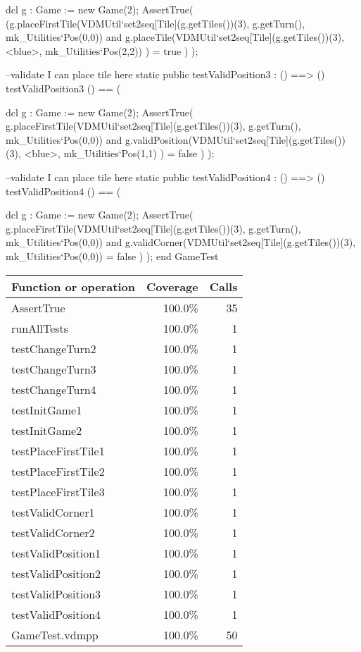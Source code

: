 \begin{vdm_al}
  dcl g : Game := new Game(2);
  AssertTrue( (g.placeFirstTile(VDMUtil`set2seq[Tile](g.getTiles())(3), g.getTurn(),
       mk_Utilities`Pos(0,0)) and g.placeTile(VDMUtil`set2seq[Tile](g.getTiles())(3),
       <blue>, mk_Utilities`Pos(2,2)) ) = true )
 );
 
 --validate I can place tile here
 static public testValidPosition3 : () ==> ()
 testValidPosition3 () == (
  
  dcl g : Game := new Game(2);
  AssertTrue( g.placeFirstTile(VDMUtil`set2seq[Tile](g.getTiles())(3), g.getTurn(),
       mk_Utilities`Pos(0,0)) and g.validPosition(VDMUtil`set2seq[Tile](g.getTiles())(3),
       <blue>, mk_Utilities`Pos(1,1) ) = false )
 );
 
 --validate I can place tile here
 static public testValidPosition4 : () ==> ()
 testValidPosition4 () == (
  
  dcl g : Game := new Game(2);
  AssertTrue( g.placeFirstTile(VDMUtil`set2seq[Tile](g.getTiles())(3), g.getTurn(),
       mk_Utilities`Pos(0,0)) and g.validCorner(VDMUtil`set2seq[Tile](g.getTiles())(3),
       mk_Utilities`Pos(0,0)) = false )
 );
end GameTest
\end{vdm_al}
\bigskip
\begin{longtable}{|l|r|r|}
\hline
Function or operation & Coverage & Calls \\
\hline
\hline
AssertTrue & 100.0\% & 35 \\
\hline
runAllTests & 100.0\% & 1 \\
\hline
testChangeTurn2 & 100.0\% & 1 \\
\hline
testChangeTurn3 & 100.0\% & 1 \\
\hline
testChangeTurn4 & 100.0\% & 1 \\
\hline
testInitGame1 & 100.0\% & 1 \\
\hline
testInitGame2 & 100.0\% & 1 \\
\hline
testPlaceFirstTile1 & 100.0\% & 1 \\
\hline
testPlaceFirstTile2 & 100.0\% & 1 \\
\hline
testPlaceFirstTile3 & 100.0\% & 1 \\
\hline
testValidCorner1 & 100.0\% & 1 \\
\hline
testValidCorner2 & 100.0\% & 1 \\
\hline
testValidPosition1 & 100.0\% & 1 \\
\hline
testValidPosition2 & 100.0\% & 1 \\
\hline
testValidPosition3 & 100.0\% & 1 \\
\hline
testValidPosition4 & 100.0\% & 1 \\
\hline
\hline
GameTest.vdmpp & 100.0\% & 50 \\
\hline
\end{longtable}

